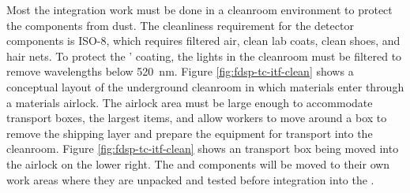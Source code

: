 Most the integration work must be done in a cleanroom environment to protect the components from dust. The cleanliness requirement for the detector components is ISO-8, which requires  filtered air, clean lab coats, clean shoes, and hair nets. To protect the '  coating, the lights in the cleanroom must be filtered to remove wavelengths below \SI{520}{nm}\cite{LBNE-docdb-8348}.  Figure \ref{fig:fdsp-tc-itf-clean} shows a conceptual layout of the underground cleanroom in which materials enter through a materials airlock. The airlock area  must be large enough to accommodate  transport boxes, the largest items, and allow workers to move around a box to remove the shipping layer and prepare the equipment for transport into the cleanroom.  Figure \ref{fig:fdsp-tc-itf-clean} shows an  transport box being moved into the airlock on the lower right. The  and  components will be moved to their own work areas where they are unpacked and tested before integration into the . 

